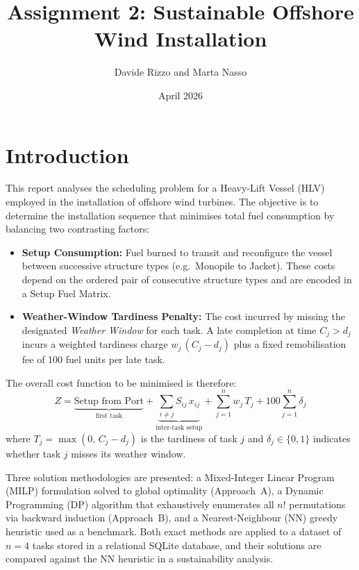 \documentclass[11pt,a4paper]{article}
\title{Assignment 2: Sustainable Offshore Wind Installation}
\author{Davide Rizzo and Marta Nasso}
\date{April 2026}
\begin{document}
\maketitle

\section{Introduction}
This report analyses the scheduling problem for a Heavy-Lift Vessel (HLV)
employed in the installation of offshore wind turbines. The objective is to
determine the installation sequence that minimises total fuel consumption by
balancing two contrasting factors:

\begin{itemize}
    \item \textbf{Setup Consumption:} Fuel burned to transit and reconfigure
          the vessel between successive structure types (e.g.\ Monopile to
          Jacket). These costs depend on the ordered pair of consecutive
          structure types and are encoded in a Setup Fuel Matrix.
    \item \textbf{Weather-Window Tardiness Penalty:} The cost incurred by
          missing the designated \emph{Weather Window} for each task. A late
          completion at time $C_j > d_j$ incurs a weighted tardiness charge
          $w_j\,(C_j - d_j)$ plus a fixed remobilisation fee of 100 fuel
          units per late task.
\end{itemize}

The overall cost function to be minimised is therefore:
\begin{equation}
    Z = \underbrace{\text{Setup from Port}}_{\text{first task}} +
        \underbrace{\sum_{i \neq j} S_{ij}\,x_{ij}}_{\text{inter-task setup}}
      + \sum_{j=1}^{n} w_j\,T_j
      + 100\sum_{j=1}^{n} \delta_j
    \label{eq:objective}
\end{equation}
where $T_j = \max(0,\,C_j - d_j)$ is the tardiness of task $j$ and
$\delta_j \in \{0,1\}$ indicates whether task $j$ misses its weather window.

Three solution methodologies are presented: a Mixed-Integer Linear Program
(MILP) formulation solved to global optimality (Approach~A), a Dynamic
Programming (DP) algorithm that exhaustively enumerates all $n!$ permutations
via backward induction (Approach~B), and a Nearest-Neighbour (NN) greedy
heuristic used as a benchmark. Both exact methods are applied to a dataset of
$n = 4$ tasks stored in a relational SQLite database, and their solutions are
compared against the NN heuristic in a sustainability analysis.
\end{document}
